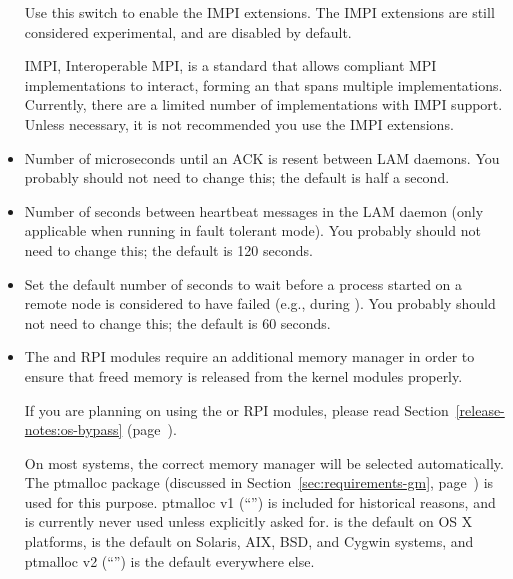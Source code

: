 \begin{itemize}
  Use this switch to enable the IMPI extensions.  The IMPI extensions
  are still considered experimental, and are disabled by default.
  
  IMPI, Interoperable MPI, is a standard that allows compliant MPI
  implementations to interact, forming an 
  that spans multiple implementations.  Currently, there are a limited
  number of implementations with IMPI support.  Unless necessary, it
  is not recommended you use the IMPI extensions.


\item {}
  
  Number of microseconds until an ACK is resent between LAM daemons.  You
  probably should not need to change this; the default is half a second.


\item {}

  Number of seconds between heartbeat messages in the LAM daemon (only
  applicable when running in fault tolerant mode).  You probably
  should not need to change this; the default is 120 seconds.


\item {}

  Set the default number of seconds to wait before a process started
  on a remote node is considered to have failed (e.g., during
  ).  You probably should not need to change this; the
  default is 60 seconds.


\item {}
  
  The  and  RPI modules require an additional memory
  manager in order to ensure that freed memory is released from the
  kernel modules properly.  
  
  If you are planning on using the  or  RPI modules,
  please read Section~\ref{release-notes:os-bypass}
  (page~\pageref{release-notes:os-bypass}).
  
  On most systems, the correct memory manager will be selected
  automatically.  The ptmalloc package (discussed in
  Section~\ref{sec:requirements-gm},
  page~\pageref{sec:requirements-gm}) is used for this purpose.
  ptmalloc v1 (``'') is included for historical
  reasons, and is currently never used unless explicitly asked for.
   is the default on OS X platforms,  is
  the default on Solaris, AIX, BSD, and Cygwin systems, and ptmalloc v2
  (``'') is the default everywhere else.
  

\end{itemize}
